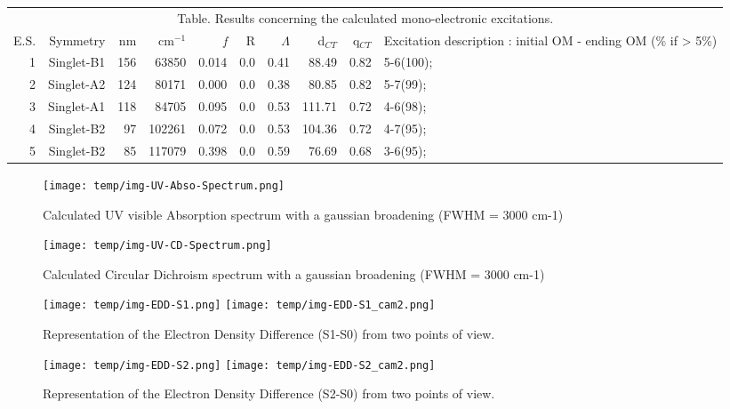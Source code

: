 \documentclass{article}%
\begin{document}
\begin{center}%
\begin{tabular}{rrrrrrrrrp{6cm}}%
\multicolumn{10}{c}{Table. Results concerning the calculated mono{-}electronic excitations.}\\%
E.S.&Symmetry& nm &cm$^{-1}$&\textit{f}&R&$\Lambda$&d$_{CT}$&q$_{CT}$&Excitation description : initial OM {-} ending OM (\% if > 5\%)\\%
\hline%
1&Singlet{-}B1&156 &63850 &0.014&0.0&0.41&88.49&0.82& 5{-}6(100); \\%
2&Singlet{-}A2&124 &80171 &0.000&0.0&0.38&80.85&0.82& 5{-}7(99); \\%
3&Singlet{-}A1&118 &84705 &0.095&0.0&0.53&111.71&0.72& 4{-}6(98); \\%
4&Singlet{-}B2&97 &102261 &0.072&0.0&0.53&104.36&0.72& 4{-}7(95); \\%
5&Singlet{-}B2&85 &117079 &0.398&0.0&0.59&76.69&0.68& 3{-}6(95); \\%
\hline%
\end{tabular}%
\end{center}%
\begin{figure}[h]%
\begin{center}%
\texttt{[image: temp/img-UV-Abso-Spectrum.png]}%
\end{center}%
\vspace{-5mm}%
\caption{Calculated UV visible Absorption spectrum with a gaussian broadening (FWHM = 3000 cm-1)}%
\end{figure}%
\begin{figure}[h]%
\begin{center}%
\texttt{[image: temp/img-UV-CD-Spectrum.png]}%
\end{center}%
\vspace{-5mm}%
\caption{Calculated Circular Dichroism spectrum with a gaussian broadening (FWHM = 3000 cm-1)}%
\end{figure}%
\begin{figure}[h]%
\begin{center}%
\texttt{[image: temp/img-EDD-S1.png]}%
\texttt{[image: temp/img-EDD-S1\_cam2.png]}%
\end{center}%
\vspace{-5mm}%
\caption{Representation of the Electron Density Difference (S1-S0) from two points of view.}%
\end{figure}%
\begin{figure}[h]%
\begin{center}%
\texttt{[image: temp/img-EDD-S2.png]}%
\texttt{[image: temp/img-EDD-S2\_cam2.png]}%
\end{center}%
\vspace{-5mm}%
\caption{Representation of the Electron Density Difference (S2-S0) from two points of view.}%
\end{figure}%
\end{document}
